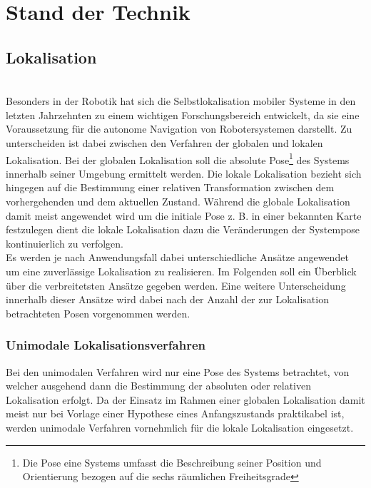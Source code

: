 \chapter{Stand der Technik}
\label{chap:tech}

\section{Lokalisation}
\\
Besonders in der Robotik hat sich die Selbstlokalisation mobiler Systeme in den letzten Jahrzehnten zu einem wichtigen Forschungsbereich entwickelt, da sie eine Voraussetzung für die autonome Navigation von Robotersystemen darstellt.  Zu unterscheiden ist dabei zwischen den Verfahren der globalen und lokalen Lokalisation. Bei der globalen Lokalisation soll die absolute Pose\footnote{Die Pose eine Systems umfasst die Beschreibung seiner Position und Orientierung bezogen auf die sechs räumlichen Freiheitsgrade } des Systems innerhalb seiner Umgebung ermittelt werden. Die lokale Lokalisation bezieht sich hingegen auf die Bestimmung einer relativen Transformation zwischen dem vorhergehenden und dem aktuellen Zustand. Während die globale Lokalisation damit meist angewendet wird um die initiale Pose z. B. in einer bekannten Karte festzulegen dient die lokale Lokalisation dazu die Veränderungen der Systempose kontinuierlich zu verfolgen.\\
Es werden je nach Anwendungsfall dabei unterschiedliche Ansätze angewendet um eine zuverlässige Lokalisation zu realisieren. Im Folgenden soll ein Überblick über die verbreitetsten Ansätze gegeben werden. Eine weitere Unterscheidung innerhalb dieser Ansätze wird dabei nach der Anzahl der zur Lokalisation betrachteten Posen vorgenommen werden. 
\subsection{Unimodale Lokalisationsverfahren}
Bei den unimodalen Verfahren wird nur eine Pose des Systems betrachtet, von welcher ausgehend dann die Bestimmung der absoluten oder relativen Lokalisation erfolgt. Da der Einsatz im Rahmen einer globalen Lokalisation damit meist nur bei Vorlage einer \red[(sinnvollen)] Hypothese eines Anfangszustands praktikabel ist, werden unimodale Verfahren vornehmlich für die lokale Lokalisation eingesetzt. 

